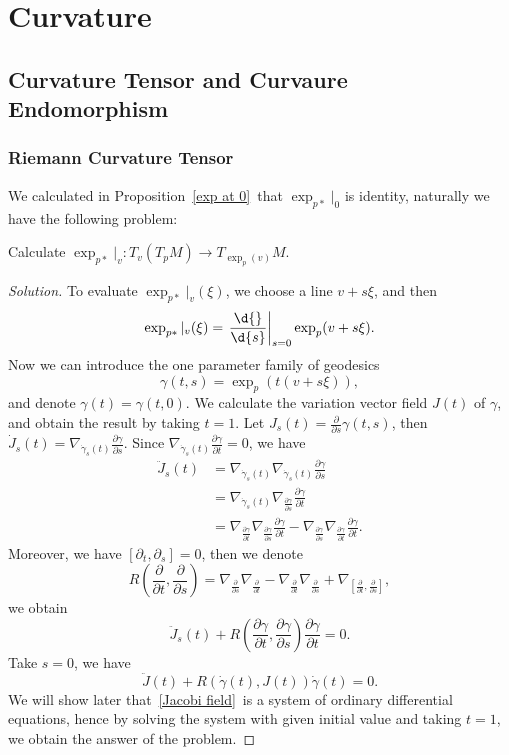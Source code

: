 \chapter{Curvature}

\section{Curvature Tensor and Curvaure Endomorphism}\label{curvature section}

\subsection*{Riemann Curvature Tensor}
We calculated in Proposition~\ref{exp at 0}~that $\exp_{p*}|_0$ is identity, naturally we have the following problem:
\begin{pro}
    Calculate $\exp_{p*}|_v:T_v(T_pM)\to T_{\exp_p(v)}M$.
\end{pro}
\begin{proof}[Solution]
    To evaluate $\exp_{p*}|_v(\xi)$, we choose a line $v+s\xi$, and then
    \[\exp_{p*}|_v(\xi)=\left.\frac{\d{}}{\d{s}}\right|_{s=0}\exp_p(v+s\xi).\]
    Now we can introduce the one parameter family of geodesics 
    \[\gamma(t,s)=\exp_p(t(v+s\xi)),\]
    and denote $\gamma(t)=\gamma(t,0)$.
    We calculate the variation vector field $J(t)$ of $\gamma$, and obtain the result by taking $t=1$.
    Let $J_s(t)=\frac{\partial{}}{\partial{s}}\gamma(t,s)$, then $\dot{J}_s(t)=\nabla_{\dot\gamma_s(t)}\frac{\partial\gamma}{\partial{s}}$.
    Since $\nabla_{\dot\gamma_s(t)}\frac{\partial\gamma}{\partial{t}}=0$, we have
    \begin{align*}
        \ddot{J}_s(t)&=\nabla_{\dot\gamma_s(t)}\nabla_{\dot\gamma_s(t)}\frac{\partial\gamma}{\partial{s}}\\
        &=\nabla_{\dot\gamma_s(t)}\nabla_{\frac{\partial\gamma}{\partial{s}}}\frac{\partial\gamma}{\partial{t}}\\
        &=\nabla_{\frac{\partial\gamma}{\partial{t}}}\nabla_{\frac{\partial\gamma}{\partial{s}}}\frac{\partial\gamma}{\partial{t}}-\nabla_{\frac{\partial\gamma}{\partial s}}\nabla_{\frac{\partial\gamma}{\partial{t}}}\frac{\partial\gamma}{\partial{t}}.
    \end{align*}
    Moreover, we have $[\partial_t,\partial_s]=0$, then we denote
    \[R\left(\frac{\partial}{\partial{t}},\frac{\partial}{\partial{s}}\right)=\nabla_{\frac{\partial}{\partial{s}}}\nabla_{\frac{\partial}{\partial{t}}}-\nabla_{\frac{\partial}{\partial{t}}}\nabla_{\frac{\partial}{\partial{s}}}+\nabla_{\left[\frac{\partial}{\partial{t}},\frac{\partial}{\partial{s}}\right]},\]
    we obtain
    \[\ddot{J}_s(t)+R\left(\frac{\partial\gamma}{\partial{t}},\frac{\partial\gamma}{\partial{s}}\right)\frac{\partial\gamma}{\partial{t}}=0.\]
    Take $s=0$, we have
    \begin{equation}
        \ddot{J}(t)+R(\dot\gamma(t),J(t))\dot\gamma(t)=0.\label{Jacobi field}
    \end{equation}
    We will show later that~\eqref{Jacobi field}~is a system of ordinary differential equations, hence by solving the system with given initial value and taking $t=1$, we obtain the answer of the problem.
\end{proof}

